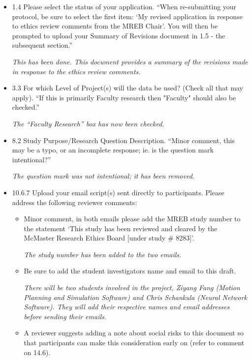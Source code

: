 \documentclass[12pt]{casletter}
\begin{document}
\begin{letter}
\begin{itemize}
\item 1.4 Please select the status of your application. ``When re-submitting
your protocol, be sure to select the first item: `My revised application in
response to ethics review comments from the MREB Chair'. You will then be
prompted to upload your Summary of Revisions document in 1.5 - the subsequent
section.''\medskip

\emph{This has been done.  This document provides a summary of the revisions
made in response to the ethics review comments.} \smallskip

\item 3.3 For which Level of Project(s) will the data be used? (Check all that
may apply). ``If this is primarily Faculty research then "Faculty" should also
be checked.'' \medskip

\emph{The ``Faculty Research'' box has now been checked.} \smallskip

\item 8.2 Study Purpose/Research Question Description.  ``Minor comment, this
may be a typo, or an incomplete response; ie. is the question mark
intentional?'' \medskip

\emph{The question mark was not intentional; it has been removed.} \smallskip

\item 10.6.7 Upload your email script(s) sent directly to participants.  Please
address the following reviewer comments: 

\begin{itemize} 
  
\item Minor comment, in both emails please add the MREB study number to the
statement `This study has been reviewed and cleared by the McMaster Research
Ethics Board [under study \# 8283]'. \smallskip

\emph{The study number has been added to the two emails.} \smallskip

\item Be sure to add the student investigators name and email to this draft. \smallskip

\emph{There will be two students involved in the project, Ziyang Fang (Motion
Planning and Simulation Software) and Chris Schankula (Neural Network Software).
They will add their respective names and email addresses before sending their
emails.} \smallskip

\item A reviewer suggests adding a note about social risks to this document so
that participants can make this consideration early on (refer to comment on
14.6). \smallskip


\end{itemize}
\end{itemize}
\end{letter}
\end{document}

